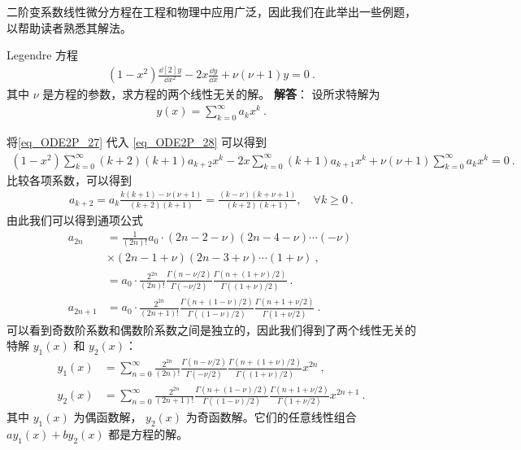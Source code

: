 二阶变系数线性微分方程在工程和物理中应用广泛，因此我们在此举出一些例题，以帮助读者熟悉其解法。

\begin{example}{Legendre 方程}
\begin{equation}\label{eq_ODE2P_28}
\begin{aligned}
    (1-x^2)\frac{\dd[2]{y}}{\dd x^2}-2x\frac{\dd y}{\dd x}+\nu(\nu+1)y=0~.
\end{aligned}
\end{equation}
其中 $\nu$ 是方程的参数，求方程的两个线性无关的解。
\textbf{解答}：
设所求特解为
\begin{equation}\label{eq_ODE2P_27}
\begin{aligned}
y(x) = \sum_{k=0}^\infty a_k x^k~.
\end{aligned}
\end{equation}

将\autoref{eq_ODE2P_27}  代入 \autoref{eq_ODE2P_28} 可以得到
\begin{equation}
\begin{aligned}
(1-x^2)\sum_{k=0}^{\infty}(k+2)(k+1)a_{k+2}x^k
-2x\sum_{k=0}^\infty (k+1)a_{k+1}x^k+\nu(\nu+1) \sum_{k=0}^\infty a_k x^k=0~.
\end{aligned}
\end{equation}
比较各项系数，可以得到
\begin{equation}
\begin{aligned}
a_{k+2} = a_k \frac{k(k+1)-\nu(\nu+1)}{(k+2)(k+1)}=\frac{(k-\nu)(k+\nu+1)}{(k+2)(k+1)},\quad \forall k\ge 0~.
\end{aligned}
\end{equation}
由此我们可以得到通项公式
\begin{equation}
\begin{aligned}
a_{2n} &= \frac{1}{(2n)!}a_0\cdot (2n-2-\nu)(2n-4-\nu)\cdots(-\nu) ~\\
&\times (2n-1+\nu)(2n-3+\nu)\cdots(1+\nu)~,\\
&=a_0\cdot \frac{2^{2n}}{(2n)! }\frac{\Gamma(n-\nu/2)}{\Gamma(-\nu/2)}\frac{\Gamma(n+(1+\nu)/2)}{\Gamma((1+\nu)/2)}~.\\
a_{2n+1} &= a_0 \cdot \frac{2^{2n}}{(2n+1)! }
\frac{\Gamma(n+(1-\nu)/2)}{\Gamma((1-\nu)/2)}\frac{\Gamma(n+1+\nu/2)}{\Gamma(1+\nu/2)}~.
\end{aligned}
\end{equation}
可以看到奇数阶系数和偶数阶系数之间是独立的，因此我们得到了两个线性无关的特解 $y_1(x)$ 和 $y_2(x)$：
\begin{equation}
\begin{aligned}
y_1(x) &= \sum_{n=0}^\infty \frac{2^{2n}}{(2n)! }\frac{\Gamma(n-\nu/2)}{\Gamma(-\nu/2)}\frac{\Gamma(n+(1+\nu)/2)}{\Gamma((1+\nu)/2)} x^{2n}~,\\
y_2(x) &= \sum_{n=0}^\infty \frac{2^{2n}}{(2n+1)! }
\frac{\Gamma(n+(1-\nu)/2)}{\Gamma((1-\nu)/2)}\frac{\Gamma(n+1+\nu/2)}{\Gamma(1+\nu/2)} x^{2n+1}~.
\end{aligned}
\end{equation}
其中 $y_1(x)$ 为偶函数解， $y_2(x)$ 为奇函数解。它们的任意线性组合 $a y_1(x)+b y_2(x)$ 都是方程的解。
\end{example}


